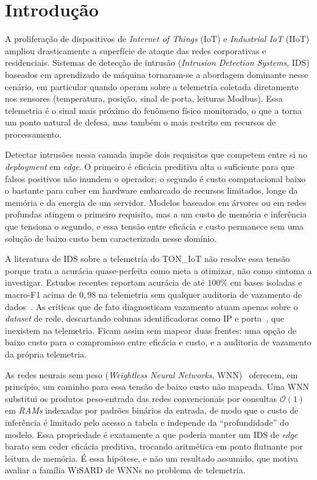 \section{Introdução}
\label{sec:intro}

A proliferação de dispositivos de \emph{Internet of Things} (IoT) e
\emph{Industrial IoT} (IIoT) ampliou drasticamente a superfície de
ataque das redes corporativas e residenciais. Sistemas de detecção de
intrusão (\emph{Intrusion Detection Systems}, IDS) baseados em
aprendizado de máquina tornaram-se a abordagem dominante nesse cenário,
em particular quando operam sobre a telemetria coletada diretamente nos
sensores (temperatura, posição, sinal de porta, leituras Modbus). Essa
telemetria é o sinal mais próximo do fenômeno físico monitorado, o que
a torna um ponto natural de defesa, mas também o mais restrito em
recursos de processamento.

Detectar intrusões nessa camada impõe dois requisitos que competem entre
si no \emph{deployment} em \emph{edge}. O primeiro é eficácia preditiva
alta o suficiente para que falsos positivos não inundem o operador; o
segundo é custo computacional baixo o bastante para caber em hardware
embarcado de recursos limitados, longe da memória e da energia de um
servidor. Modelos baseados em árvores ou em redes profundas atingem o
primeiro requisito, mas a um custo de memória e inferência que tensiona
o segundo, e essa tensão entre eficácia e custo permanece sem uma
solução de baixo custo bem caracterizada nesse domínio.

A literatura de IDS sobre a telemetria do TON\_IoT não resolve essa
tensão porque trata a acurácia quase-perfeita como meta a otimizar, não
como sintoma a investigar. Estudos recentes reportam acurácia de até
$100\%$ em bases isoladas e macro-F1 acima de $0{,}98$ na telemetria sem
qualquer auditoria de vazamento de
dados~\cite{sharrab2025analysis,alotaibi2023stacking,benaddi2025near}.
As críticas que de fato diagnosticam vazamento atuam apenas sobre o
\emph{dataset} de rede, descartando colunas identificadoras como IP e
porta~\cite{shaikhanova2025audit,dharini2026efficient}, que inexistem
na telemetria. Ficam assim sem mapear duas frentes: uma opção de baixo
custo para o compromisso entre eficácia e custo, e a auditoria de
vazamento da própria telemetria.

As redes neurais sem peso (\emph{Weightless Neural Networks},
WNN)~\cite{aleksander1984wisard,aleksander2009brief} oferecem, em
princípio, um caminho para essa tensão de baixo custo não mapeada. Uma
WNN substitui os produtos peso-entrada das redes convencionais por
consultas $\mathcal{O}(1)$ em \emph{RAMs} indexadas por padrões binários
da entrada, de modo que o custo de inferência é limitado pelo acesso a
tabela e independe da ``profundidade'' do modelo. Essa propriedade é
exatamente a que poderia manter um IDS de \emph{edge} barato sem ceder
eficácia preditiva, trocando aritmética em ponto flutuante por leitura
de memória. É essa hipótese, e não um resultado assumido, que motiva
avaliar a família WiSARD de WNNs no problema de telemetria.

